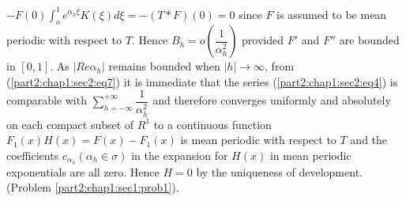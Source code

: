 $- F(0) \int^1_o e^{\alpha_h \xi} K (\xi) d \xi = - (T \ast F)(0) =
0$ since $F$ is assumed to be mean periodic with respect to $T$. Hence
$B_h = o \left(\dfrac{1}{\alpha_h^2}\right)$ provided $F'$ and $F''$ are bounded
in $[0, 1]$. As $|Re \alpha_h|$ remains bounded when $|h| \to \infty$,
from (\ref{part2:chap1:sec2:eq7}) it is immediate that the series
(\ref{part2:chap1:sec2:eq4}) is comparable with 
$\sum\limits^{ + \infty}_{h = - \infty} \dfrac{1}{\alpha_h^2}$ and
therefore converges uniformly and absolutely on each compact subset of
$R^1$ to a continuous function $F_1(x) H(x) = F(x) - F_1 (x)$ is mean
periodic with respect to $T$ and the coefficients $c_{\alpha_h}
(\alpha_h \in \sigma)$ in the expansion for $H(x)$ in mean periodic
exponentials are all zero. Hence $H = 0$ by the uniqueness of
development. (Problem \ref{part2:chap1:sec1:prob1}). 
